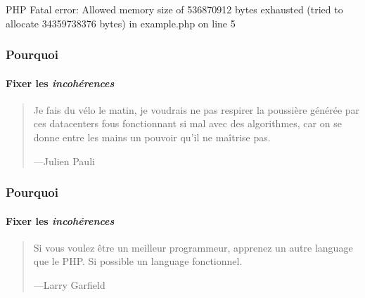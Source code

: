 \begin{frame}[fragile]
    \begin{spverbatim}
        PHP Fatal error: Allowed memory size of 536870912 bytes exhausted (tried to allocate 34359738376 bytes) in example.php on line 5
    \end{spverbatim}
\end{frame}

\begin{frame}
	\frametitle{Pourquoi}
    \framesubtitle{Fixer les \textit{incohérences}}

    \begin{quote}
        Je fais du vélo le matin, je voudrais ne pas respirer la poussière générée
        par ces datacenters fous fonctionnant si mal avec des algorithmes,
        car on se donne entre les mains un pouvoir qu'il ne maîtrise pas.

        \begin{flushright}
            \tiny{---Julien Pauli}
        \end{flushright}
    \end{quote}
\end{frame}

\begin{frame}
	\frametitle{Pourquoi}
    \framesubtitle{Fixer les \textit{incohérences}}

    \begin{quote}
        Si vous voulez être un meilleur programmeur, apprenez un autre language que
        le PHP. Si possible un language fonctionnel.

        \begin{flushright}
            \tiny{---Larry Garfield}
        \end{flushright}
    \end{quote}
\end{frame}


